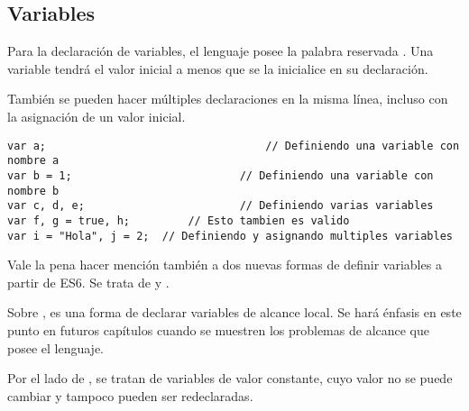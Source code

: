 \subsection{Variables}

Para la declaración de variables, el lenguaje posee la palabra reservada . Una variable tendrá el valor inicial  a menos que se la inicialice en su declaración.

También se pueden hacer múltiples declaraciones en la misma línea, incluso con la asignación de un valor inicial.

\begin{lstlisting}[title={Declarando variables}]
var a;									// Definiendo una variable con nombre a
var b = 1; 	 						// Definiendo una variable con nombre b
var c, d, e;	 					// Definiendo varias variables
var f, g = true, h;			// Esto tambien es valido
var i = "Hola", j = 2;	// Definiendo y asignando multiples variables
\end{lstlisting}

Vale la pena hacer mención también a dos nuevas formas de definir variables a partir de ES6. Se trata de  y .

Sobre , es una forma de declarar variables de alcance local. Se hará énfasis en este punto en futuros capítulos cuando se muestren los problemas de alcance que posee el lenguaje.

Por el lado de , se tratan de variables de valor constante, cuyo valor no se puede cambiar y tampoco pueden ser redeclaradas.
